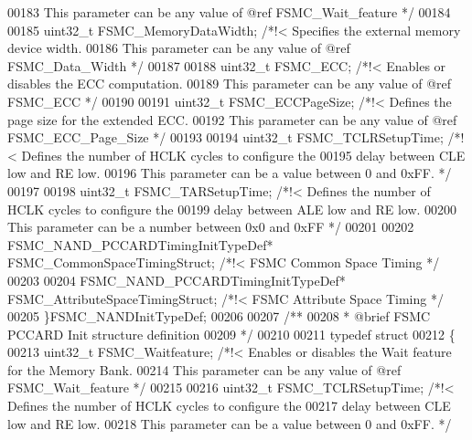 \begin{DoxyCode}
00183 \textcolor{comment}{                                       This parameter can be any value of @ref FSMC\_Wait\_feature */}
00184 
00185   uint32\_t FSMC_MemoryDataWidth;  \textcolor{comment}{/*!< Specifies the external memory device width.}
00186 \textcolor{comment}{                                       This parameter can be any value of @ref FSMC\_Data\_Width */}
00187 
00188   uint32\_t FSMC_ECC;              \textcolor{comment}{/*!< Enables or disables the ECC computation.}
00189 \textcolor{comment}{                                       This parameter can be any value of @ref FSMC\_ECC */}
00190 
00191   uint32\_t FSMC_ECCPageSize;      \textcolor{comment}{/*!< Defines the page size for the extended ECC.}
00192 \textcolor{comment}{                                       This parameter can be any value of @ref FSMC\_ECC\_Page\_Size */}
00193 
00194   uint32\_t FSMC_TCLRSetupTime;    \textcolor{comment}{/*!< Defines the number of HCLK cycles to configure the}
00195 \textcolor{comment}{                                       delay between CLE low and RE low.}
00196 \textcolor{comment}{                                       This parameter can be a value between 0 and 0xFF. */}
00197 
00198   uint32\_t FSMC_TARSetupTime;     \textcolor{comment}{/*!< Defines the number of HCLK cycles to configure the}
00199 \textcolor{comment}{                                       delay between ALE low and RE low.}
00200 \textcolor{comment}{                                       This parameter can be a number between 0x0 and 0xFF */}
00201 
00202   FSMC\_NAND\_PCCARDTimingInitTypeDef*  FSMC_CommonSpaceTimingStruct;   \textcolor{comment}{/*!< FSMC Common Space Timing */}
00203 
00204   FSMC\_NAND\_PCCARDTimingInitTypeDef*  FSMC_AttributeSpaceTimingStruct; \textcolor{comment}{/*!< FSMC Attribute Space
       Timing */}
00205 \}FSMC\_NANDInitTypeDef;
00206 
00207 \textcolor{comment}{/** }
00208 \textcolor{comment}{  * @brief  FSMC PCCARD Init structure definition}
00209 \textcolor{comment}{  */}
00210 
00211 \textcolor{keyword}{typedef} \textcolor{keyword}{struct}
00212 \{
00213   uint32\_t FSMC_Waitfeature;    \textcolor{comment}{/*!< Enables or disables the Wait feature for the Memory Bank.}
00214 \textcolor{comment}{                                    This parameter can be any value of @ref FSMC\_Wait\_feature */}
00215 
00216   uint32\_t FSMC_TCLRSetupTime;  \textcolor{comment}{/*!< Defines the number of HCLK cycles to configure the}
00217 \textcolor{comment}{                                     delay between CLE low and RE low.}
00218 \textcolor{comment}{                                     This parameter can be a value between 0 and 0xFF. */}

\end{DoxyCode}
